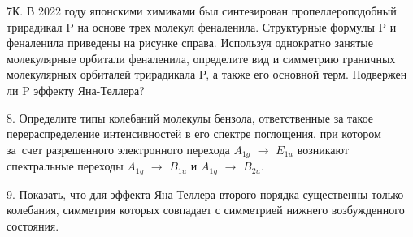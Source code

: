 7К. В 2022 году японскими химиками был синтезирован пропеллероподобный трирадикал P на основе трех молекул феналенила. Структурные формулы P и феналенила приведены на рисунке справа. Используя однократно занятые молекулярные орбитали феналенила, определите вид и симметрию граничных молекулярных орбиталей трирадикала P, а также его основной терм. Подвержен ли P эффекту Яна-Теллера?
\par
8. Определите типы колебаний молекулы бензола, ответственные за такое перераспределение интенсивностей в его спектре поглощения, при котором за~счет разрешенного электронного перехода $A_{1g}$ $\rightarrow$ $E_{1u}$ возникают спектральные переходы $A_{1g}$ $\rightarrow$ $B_{1u}$ и $A_{1g}$ $\rightarrow$ $B_{2u}$.
\par
9. Показать, что для эффекта Яна-Теллера второго порядка существенны только колебания, симметрия которых совпадает с симметрией нижнего возбужденного состояния.
\par
